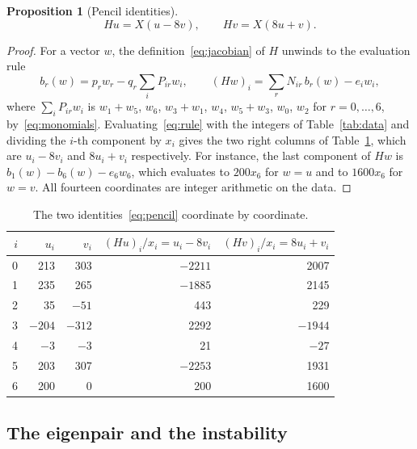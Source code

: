 \documentclass[11pt,a4paper]{article}
\theoremstyle{plain}
\newtheorem{proposition}[theorem]{Proposition}
\theoremstyle{definition}
\theoremstyle{remark}
\numberwithin{equation}{section}
\begin{document}
\begin{proposition}[Pencil identities]\label{prop:pencil}
\begin{equation}\label{eq:pencil}
Hu=X(u-8v),\qquad Hv=X(8u+v).
\end{equation}
\end{proposition}

\begin{proof}
For a vector $w$, the definition~\eqref{eq:jacobian} of $H$ unwinds to the evaluation rule
\begin{equation}\label{eq:rule}
b_r(w)=p_rw_r-q_r\sum_iP_{ir}w_i,\qquad (Hw)_i=\sum_rN_{ir}\,b_r(w)-e_iw_i ,
\end{equation}
where $\sum_iP_{ir}w_i$ is $w_1+w_5$, $w_6$, $w_3+w_1$, $w_4$, $w_5+w_3$, $w_0$, $w_2$ for $r=0,\dots,6$, by~\eqref{eq:monomials}. Evaluating~\eqref{eq:rule} with the integers of Table~\ref{tab:data} and dividing the $i$-th component by $x_i$ gives the two right columns of Table~\ref{tab:pencil}, which are $u_i-8v_i$ and $8u_i+v_i$ respectively. For instance, the last component of $Hw$ is $b_1(w)-b_6(w)-e_6w_6$, which evaluates to $200x_6$ for $w=u$ and to $1600x_6$ for $w=v$. All fourteen coordinates are integer arithmetic on the data.
\end{proof}

\begin{table}[htbp]
\centering
\begin{tabular}{@{}rrrrr@{}}
\toprule
$i$ & $u_i$ & $v_i$ & $(Hu)_i/x_i=u_i-8v_i$ & $(Hv)_i/x_i=8u_i+v_i$\\
\midrule
0 & 213 & 303 & $-2211$ & 2007 \\
1 & 235 & 265 & $-1885$ & 2145 \\
2 & 35 & $-51$ & 443 & 229 \\
3 & $-204$ & $-312$ & 2292 & $-1944$ \\
4 & $-3$ & $-3$ & 21 & $-27$ \\
5 & 203 & 307 & $-2253$ & 1931 \\
6 & 200 & 0 & 200 & 1600 \\
\bottomrule
\end{tabular}
\caption{The two identities~\eqref{eq:pencil} coordinate by coordinate.}
\label{tab:pencil}
\end{table}

\subsection{The eigenpair and the instability}
\end{document}
